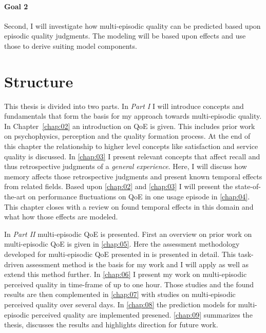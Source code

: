 \paragraph*{Goal 2}
Second, I will investigate how multi-episodic quality can be predicted based upon episodic quality judgments.
The modeling will be based upon effects and use those to derive suiting model components.

\section{Structure}
This thesis is divided into two parts.
In \emph{Part I} I will introduce concepts and fundamentals that form the basis for my approach towards multi-episodic quality.
In Chapter~\ref{chap:02} an introduction on \ac{QoE} is given.
This includes prior work on psychophysics, perception and the quality formation process.
At the end of this chapter the relationship to higher level concepts like satisfaction and service quality is discussed.
In \autoref{chap:03} I present relevant concepts that affect recall and thus retrospective judgments of a \emph{general experience}.
Here, I will discuss how memory affects those retrospective judgments and present known temporal effects from related fields.
Based upon \autoref{chap:02} and \autoref{chap:03} I will present the state-of-the-art on performance fluctuations on QoE in one usage episode in \autoref{chap:04}.
This chapter closes with a review on found temporal effects in this domain and what how those effects are modeled.

In \emph{Part II} multi-episodic QoE is presented.
First an overview on prior work on multi-episodic QoE is given in \autoref{chap:05}.
Here the assessment methodology developed for multi-episodic QoE presented in \cite{moller_single-call_2011} is presented in detail.
This task-driven assessment method is the basis for my work and I will apply as well as extend this method further.
In \autoref{chap:06} I present my work on multi-episodic perceived quality in time-frame of up to one hour.
Those studies and the found results are then complemented in \autoref{chap:07} with studies on multi-episodic perceived quality over several days.
In \autoref{chap:08} the prediction models for multi-episodic perceived quality are implemented presened.
\autoref{chap:09} summarizes the thesis, discusses the results and highlights direction for future work.